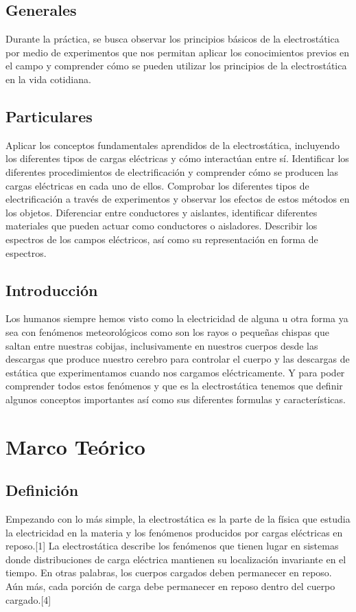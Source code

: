 \documentclass[14pt]{article}
\begin{document}
	\subsection{Generales}
	Durante la práctica, se busca observar los principios básicos de la electrostática por medio de experimentos que nos permitan aplicar los conocimientos previos en el campo y comprender cómo se pueden utilizar los principios de la electrostática en la vida cotidiana.
	\subsection{Particulares}
	Aplicar los conceptos fundamentales aprendidos de la electrostática, incluyendo los diferentes tipos de cargas eléctricas y cómo interactúan entre sí.
Identificar los diferentes procedimientos de electrificación y comprender cómo se producen las cargas eléctricas en cada uno de ellos.
Comprobar los diferentes tipos de electrificación a través de experimentos y observar los efectos de estos métodos en los objetos.
Diferenciar entre conductores y aislantes, identificar diferentes materiales que pueden actuar como conductores o aisladores.
Describir los espectros de los campos eléctricos, así como su representación en forma de espectros.
	\subsection{Introducción}
	Los humanos siempre hemos visto como la electricidad de alguna u otra forma ya sea con fenómenos meteorológicos como son los rayos o pequeñas chispas que saltan entre nuestras cobijas, inclusivamente en nuestros cuerpos desde las descargas que produce nuestro cerebro para controlar el cuerpo y las descargas de estática que experimentamos cuando nos cargamos eléctricamente. Y para poder comprender todos estos fenómenos y que es la electrostática tenemos que definir algunos conceptos importantes así como sus diferentes formulas y características. 
	\section {Marco Teórico}
	  	
	\subsection{Definición}
	Empezando con lo más simple, la electrostática es la parte de la física que estudia la electricidad en la materia y los
	fenómenos producidos por cargas eléctricas en reposo.[1]
	La electrostática describe los fenómenos que tienen lugar en sistemas donde distribuciones de carga eléctrica mantienen su localización invariante en el tiempo. En
	otras palabras, los cuerpos cargados deben permanecer en reposo. Aún más, cada porción de carga debe permanecer en reposo dentro del cuerpo cargado.[4]
\end{document}
